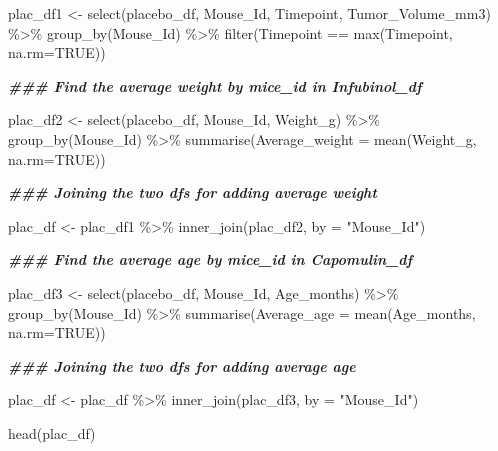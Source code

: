 \documentclass[
]{article}
\newenvironment{Shaded}{\begin{snugshade}}{\end{snugshade}}
\newcommand{\AttributeTok}[1]{\textcolor[rgb]{0.77,0.63,0.00}{#1}}
\newcommand{\ConstantTok}[1]{\textcolor[rgb]{0.00,0.00,0.00}{#1}}
\newcommand{\DocumentationTok}[1]{\textcolor[rgb]{0.56,0.35,0.01}{\textbf{\textit{#1}}}}
\newcommand{\FunctionTok}[1]{\textcolor[rgb]{0.00,0.00,0.00}{#1}}
\newcommand{\NormalTok}[1]{#1}
\newcommand{\OtherTok}[1]{\textcolor[rgb]{0.56,0.35,0.01}{#1}}
\newcommand{\SpecialCharTok}[1]{\textcolor[rgb]{0.00,0.00,0.00}{#1}}
\newcommand{\StringTok}[1]{\textcolor[rgb]{0.31,0.60,0.02}{#1}}
\begin{document}
\begin{Shaded}
\begin{Highlighting}[]
\NormalTok{plac\_df1 }\OtherTok{\textless{}{-}} \FunctionTok{select}\NormalTok{(placebo\_df, Mouse\_Id, Timepoint, Tumor\_Volume\_mm3) }\SpecialCharTok{\%\textgreater{}\%}
  \FunctionTok{group\_by}\NormalTok{(Mouse\_Id) }\SpecialCharTok{\%\textgreater{}\%}
  \FunctionTok{filter}\NormalTok{(Timepoint }\SpecialCharTok{==} \FunctionTok{max}\NormalTok{(Timepoint, }\AttributeTok{na.rm=}\ConstantTok{TRUE}\NormalTok{))}

\DocumentationTok{\#\#\# Find the average weight by mice\_id in Infubinol\_df}


\NormalTok{plac\_df2 }\OtherTok{\textless{}{-}} \FunctionTok{select}\NormalTok{(placebo\_df, Mouse\_Id, Weight\_g) }\SpecialCharTok{\%\textgreater{}\%}
  \FunctionTok{group\_by}\NormalTok{(Mouse\_Id) }\SpecialCharTok{\%\textgreater{}\%}
 \FunctionTok{summarise}\NormalTok{(}\AttributeTok{Average\_weight =} \FunctionTok{mean}\NormalTok{(Weight\_g, }\AttributeTok{na.rm=}\ConstantTok{TRUE}\NormalTok{))}

\DocumentationTok{\#\#\# Joining the two df\textquotesingle{}s for adding average weight}

\NormalTok{plac\_df }\OtherTok{\textless{}{-}}\NormalTok{ plac\_df1 }\SpecialCharTok{\%\textgreater{}\%} \FunctionTok{inner\_join}\NormalTok{(plac\_df2, }\AttributeTok{by =} \StringTok{"Mouse\_Id"}\NormalTok{)}

\DocumentationTok{\#\#\# Find the average age by mice\_id in Capomulin\_df}

\NormalTok{plac\_df3 }\OtherTok{\textless{}{-}} \FunctionTok{select}\NormalTok{(placebo\_df, Mouse\_Id, Age\_months) }\SpecialCharTok{\%\textgreater{}\%}
  \FunctionTok{group\_by}\NormalTok{(Mouse\_Id) }\SpecialCharTok{\%\textgreater{}\%}
 \FunctionTok{summarise}\NormalTok{(}\AttributeTok{Average\_age =} \FunctionTok{mean}\NormalTok{(Age\_months, }\AttributeTok{na.rm=}\ConstantTok{TRUE}\NormalTok{))}

\DocumentationTok{\#\#\# Joining the two df\textquotesingle{}s for adding average age}

\NormalTok{plac\_df }\OtherTok{\textless{}{-}}\NormalTok{ plac\_df }\SpecialCharTok{\%\textgreater{}\%} \FunctionTok{inner\_join}\NormalTok{(plac\_df3, }\AttributeTok{by =} \StringTok{"Mouse\_Id"}\NormalTok{)}

\FunctionTok{head}\NormalTok{(plac\_df)}
\end{Highlighting}
\end{Shaded}
\end{document}

